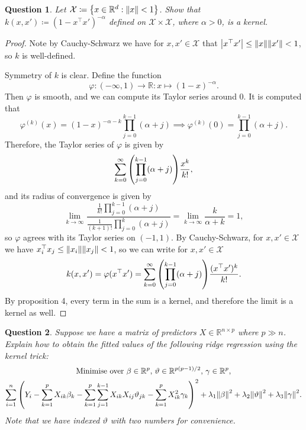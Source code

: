 \documentclass{article}
\theoremstyle{plain}
\newtheorem{question}{Question}
\theoremstyle{remark}
\renewcommand{\theta}{\vartheta}
\renewcommand{\phi}{\varphi}
\newcommand{\Bb}{\mathbb}
\newcommand{\Cal}{\mathcal}
\newcommand{\RR}{\Bb R}
\newcommand\XX{\Cal X}
\newcommand{\T}{^\top} %
\newcommand\ceq\coloneqq %
\begin{document}
\begin{question}
	Let $\XX \ceq \qty{x \in \RR^d : \norm{x} < 1}$. Show that $k(x, x') \ceq (1 - x\T x')^{-\alpha}$ defined on $\XX \times \XX$, where $\alpha > 0$, is a kernel.
\end{question}

\begin{proof}
	Note by Cauchy-Schwarz we have for $x, x' \in \XX$ that $\abs{x\T x'} \leq \norm{x} \norm{x'} < 1$, so $k$ is well-defined. 
	
	Symmetry of $k$ is clear. Define the function 
	\[
	\phi \colon (-\infty, 1) \to \RR \colon x \mapsto (1-x)^{-\alpha}. 
	\]
	Then $\phi$ is smooth, and we can compute its Taylor series around 0. It is computed that 
	\[
	\phi^{(k)}(x) = (1-x)^{-\alpha - k} \prod_{j=0}^{k-1}(\alpha + j) \implies \phi^{(k)}(0) = \prod_{j=0}^{k-1} (\alpha + j). 	\]
	Therefore, the Taylor series of $\phi$ is given by
	\[
	\sum_{k=0}^\infty \qty(\prod_{j=0}^{k-1} (\alpha + j)) \frac{x^k}{k!}, 
	\]
	and its radius of convergence is given by
	\[
	\lim_{k\to\infty} \frac{\frac{1}{k!}\prod_{j=0}^{k-1} (\alpha + j)}{\frac{1}{(k+1)!} \prod_{j=0}^k (\alpha + j)} = \lim_{k\to\infty} \frac{k}{\alpha + k} = 1,
	\]
	so $\phi$ agrees with its Taylor series on $(-1, 1)$. By Cauchy-Schwarz, for $x, x' \in \XX$ we have $x_i\T x_j \leq \norm{x_i} \norm{x_j} < 1$, so we can write for $x, x' \in \XX$
	\[
	k(x, x') = \phi(x\T x') = \sum_{k=0}^\infty \qty(\prod_{j=0}^{k-1} (\alpha + j)) \frac{(x\T x')^k}{k!}.
	\]
	By proposition 4, every term in the sum is a kernel, and therefore the limit is a kernel as well. 
\end{proof}


\begin{question}
	Suppose we have a matrix of predictors $X \in \RR^{n \times p}$ where $p \gg n$. Explain how to obtain the fitted values of the following ridge regression using the kernel trick:
	\begin{gather*}
		\text{Minimise over $\beta \in \RR^p$, $\theta \in \RR^{p(p-1)/2}$, $\gamma \in \RR^p$,} \\
		\sum_{i=1}^n \qty(Y_i - \sum_{k=1}^p X_{ik}\beta_k - \sum_{k=1}^p \sum_{j=1}^{k-1} X_{ik} X_{ij} \theta_{jk} - \sum_{k=1}^p X_{ik}^2\gamma_k)^2 + \lambda_1 \norm{\beta}^2 + \lambda_2 \norm{\theta}^2 + \lambda_3\norm{\gamma}^2. 
	\end{gather*}
Note that we have indexed $\theta$ with two numbers for convenience. 
\end{question}
\end{document}
